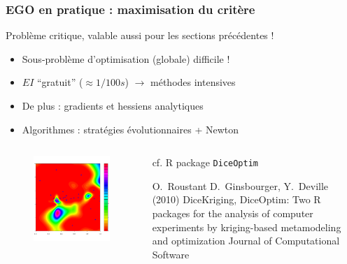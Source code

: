 \begin{frame}
\frametitle{EGO en pratique : maximisation du critère}

\begin{block}{Problème critique, valable aussi pour les sections précédentes !}
\begin{itemize}
 \item Sous-problème d'optimisation (globale) difficile !
 \item $EI$ ``gratuit'' ($\approx 1/100s$) $\rightarrow$ méthodes intensives
 \item De plus : gradients et hessiens analytiques
 \item Algorithmes : stratégies évolutionnaires + Newton
\end{itemize}
\end{block}

\begin{columns}
 \begin{column}{.5\textwidth}

\begin{figure}[h!]  \centering	
\includegraphics[trim=1mm 15mm 20mm 20mm, clip, width=.7\textwidth]{fig/AEI.png} 
\end{figure}  
 \end{column}
 \begin{column}{.5\textwidth}
\begin{block}{cf. R package \texttt{DiceOptim}}
\scriptsize{
 \begin{thebibliography}{7}
\beamertemplatearticlebibitems
     O.~Roustant D.~Ginsbourger, Y.~Deville (2010)
         \newblock DiceKriging, DiceOptim: Two R packages for the analysis of computer experiments by kriging-based metamodeling and optimization  
         \newblock Journal of Computational Software
 \end{thebibliography}
}
\end{block}
 \end{column}
\end{columns}
\end{frame}

